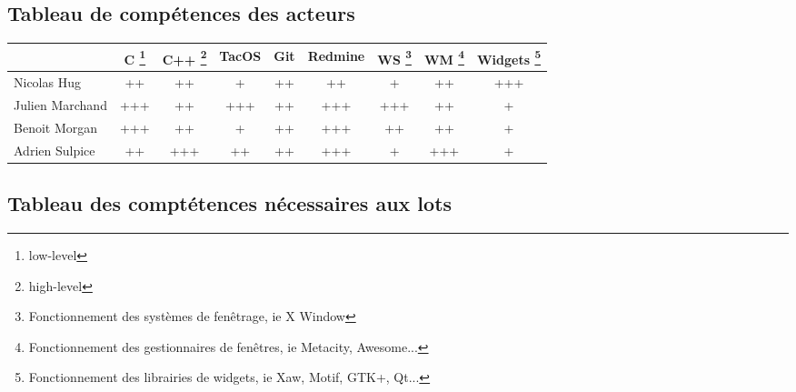 \subsection{Tableau de compétences des acteurs}
\begin{tabular}{|l|c|c|c|c|c|c|c|c|}
  \hline &  C \footnote{low-level} & C++ \footnote{high-level}  & TacOS & Git & Redmine & WS \footnote{Fonctionnement des systèmes de fenêtrage, ie X Window} & WM \footnote{Fonctionnement des gestionnaires de fenêtres, ie Metacity, Awesome...} & Widgets \footnote{Fonctionnement des librairies de widgets, ie Xaw, Motif, GTK+, Qt...}  \\
  \hline
  Nicolas Hug       &   ++    &   ++    &   +   &   ++    &   ++    &   +     &   ++    &   +++ \\
  \hline
  Julien Marchand   &   +++   &   ++    &  +++  &   ++    &   +++   &   +++   &   ++    &   + \\
  \hline
  Benoit Morgan     &   +++   &   ++    &   +   &   ++    &   +++   &   ++    &   ++    &   + \\
  \hline
  Adrien Sulpice    &   ++    &   +++   &   ++  &   ++    &   +++   &   +     &   +++   &   + \\
  \hline
\end{tabular}

\subsection{Tableau des comptétences nécessaires aux lots}
